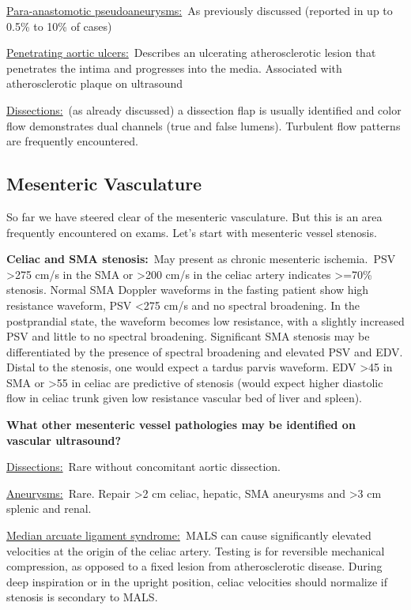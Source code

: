 \documentclass[
]{book}
\begin{document}
\underline{Para-anastomotic pseudoaneurysms:}~As previously discussed
(reported in up to 0.5\% to 10\% of cases)

\underline{Penetrating aortic ulcers:}~Describes an ulcerating
atherosclerotic lesion that penetrates the intima and progresses into
the media. Associated with atherosclerotic plaque on ultrasound

\underline{Dissections:}~(as already discussed) a dissection flap is usually
identified and color flow demonstrates dual channels (true and false
lumens). Turbulent flow patterns are frequently encountered.

\hypertarget{mesenteric-vasculature}{%
\subsection{Mesenteric Vasculature}\label{mesenteric-vasculature}}

So far we have steered clear of the mesenteric vasculature. But this is
an area frequently encountered on exams. Let's start with mesenteric
vessel stenosis.

\textbf{Celiac and SMA stenosis:}~May present as chronic mesenteric
ischemia.~PSV \textgreater275 cm/s in the SMA or \textgreater200 cm/s in the celiac artery
indicates \textgreater=70\% stenosis. Normal SMA Doppler waveforms in the fasting
patient show high resistance waveform, PSV \textless275 cm/s and no spectral
broadening. In the postprandial state, the waveform becomes low
resistance, with a slightly increased PSV and little to no spectral
broadening. Significant SMA stenosis may be differentiated by the
presence of spectral broadening and elevated PSV and EDV. Distal to the
stenosis, one would expect a tardus parvis waveform. EDV \textgreater45 in SMA or
\textgreater55 in celiac are predictive of stenosis (would expect higher diastolic
flow in celiac trunk given low resistance vascular bed of liver and
spleen).

\textbf{What other mesenteric vessel pathologies may be identified on vascular
ultrasound?}

\underline{Dissections:}~Rare without concomitant aortic dissection.

\underline{Aneurysms:}~Rare. Repair \textgreater2 cm celiac, hepatic, SMA aneurysms and
\textgreater3 cm splenic and renal.

\underline{Median arcuate ligament syndrome:}~MALS can cause significantly
elevated velocities at the origin of the celiac artery. Testing is for
reversible mechanical compression, as opposed to a fixed lesion from
atherosclerotic disease. During deep inspiration or in the upright
position, celiac velocities should normalize if stenosis is secondary to
MALS.
\end{document}
